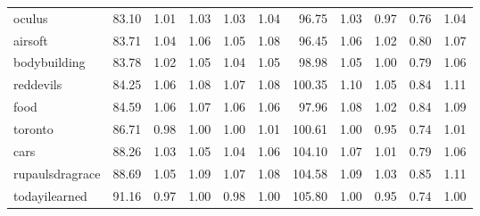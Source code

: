 \begin{tabular}{lrrrrrrrrrr}
oculus              &          83.10 &                1.01 &                1.03 &                1.03 &                1.04 &                 96.75 &                       1.03 &                       0.97 &                       0.76 &                       1.04 \\
airsoft             &          83.71 &                1.04 &                1.06 &                1.05 &                1.08 &                 96.45 &                       1.06 &                       1.02 &                       0.80 &                       1.07 \\
bodybuilding        &          83.78 &                1.02 &                1.05 &                1.04 &                1.05 &                 98.98 &                       1.05 &                       1.00 &                       0.79 &                       1.06 \\
reddevils           &          84.25 &                1.06 &                1.08 &                1.07 &                1.08 &                100.35 &                       1.10 &                       1.05 &                       0.84 &                       1.11 \\
food                &          84.59 &                1.06 &                1.07 &                1.06 &                1.06 &                 97.96 &                       1.08 &                       1.02 &                       0.84 &                       1.09 \\
toronto             &          86.71 &                0.98 &                1.00 &                1.00 &                1.01 &                100.61 &                       1.00 &                       0.95 &                       0.74 &                       1.01 \\
cars                &          88.26 &                1.03 &                1.05 &                1.04 &                1.06 &                104.10 &                       1.07 &                       1.01 &                       0.79 &                       1.06 \\
rupaulsdragrace     &          88.69 &                1.05 &                1.09 &                1.07 &                1.08 &                104.58 &                       1.09 &                       1.03 &                       0.85 &                       1.11 \\
todayilearned       &          91.16 &                0.97 &                1.00 &                0.98 &                1.00 &                105.80 &                       1.00 &                       0.95 &                       0.74 &                       1.00 \\

\end{tabular}
